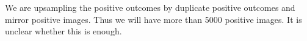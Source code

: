 \documentclass[conference,compsoc]{IEEEtran}
\begin{document}
We are upsampling the positive outcomes by duplicate positive outcomes and mirror positive images. Thus we will have more than 5000 positive images. It is unclear whether this is enough.




\end{document}
